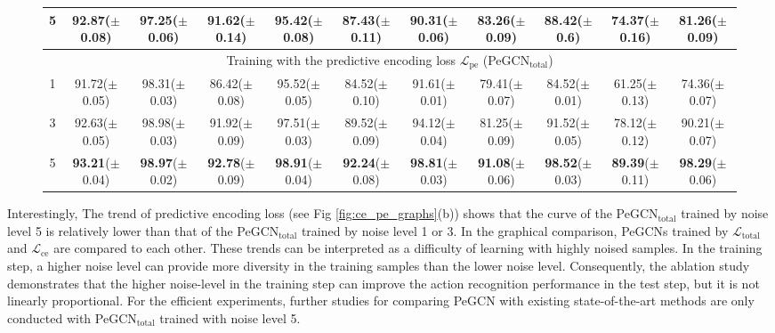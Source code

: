 \documentclass[runningheads]{llncs}
\begin{document}
\begin{figure*}[t]
\begin{minipage}{\linewidth}
{\begin{tabular}{c c c c c c c c cc c}
		  5 &  92.87($\pm$0.08)&	97.25($\pm$0.06)&	91.62($\pm$0.14)&	95.42($\pm$0.08)&	87.43($\pm$0.11)&	90.31($\pm$0.06)&	83.26($\pm$0.09)&	88.42($\pm$0.6) &	74.37($\pm$0.16)&	81.26($\pm$0.09)\\
		\midrule
		\multicolumn{11}{c}{Training with the predictive encoding loss $\mathcal{L}_{\text{pe}}$ (PeGCN$_{\text{total}}$)} \\ 
		\midrule
		  1 &  91.72($\pm$0.05)&	98.31($\pm$0.03)&	86.42($\pm$0.08)&	95.52($\pm$0.05)&	84.52($\pm$0.10)&	91.61($\pm$0.01)&	79.41($\pm$0.07)&	84.52($\pm$0.01) &	61.25($\pm$0.13)&	74.36($\pm$0.07)\\
		  3 &  92.63($\pm$0.05)&	98.98($\pm$0.03)&	91.92($\pm$0.09)&	97.51($\pm$0.03)&	89.52($\pm$0.09)&	94.12($\pm$0.04)&	81.25($\pm$0.09)&	91.52($\pm$0.05) &	78.12($\pm$0.12)&	90.21($\pm$0.07)\\
		  5 & \textbf{93.21}($\pm$0.04)& \textbf{98.97}($\pm$0.02)&	\textbf{92.78}($\pm$0.09)&	\textbf{98.91}($\pm$0.04)&	\textbf{92.24}($\pm$0.08)&	\textbf{98.81}($\pm$0.03)&	\textbf{91.08}($\pm$0.06)&	\textbf{98.52}($\pm$0.03) &	\textbf{89.39}($\pm$0.11)&	\textbf{98.29}($\pm$0.06)  \\
		\midrule
		\bottomrule
	\end{tabular}
	}
\end{minipage}
\label{tbl:abl} 
\vspace{-4ex}
\end{figure*}

Interestingly, The trend of predictive encoding loss (see Fig \ref{fig:ce_pe_graphs}(b)) shows that the curve of the PeGCN$_{\text{total}}$ trained by noise level 5 is relatively lower than that of the PeGCN$_{\text{total}}$ trained by noise level 1 or 3. In the graphical comparison, PeGCNs trained by $\mathcal{L}_{\text{total}}$ and  $\mathcal{L}_{\text{ce}}$ are compared to each other. These trends can be interpreted as a difficulty of learning with highly noised samples. In the training step, a higher noise level can provide more diversity in the training samples than the lower noise level. Consequently, the ablation study demonstrates that the higher noise-level in the training step can improve the action recognition performance in the test step, but it is not linearly proportional. For the efficient experiments, further studies for comparing PeGCN with existing state-of-the-art methods are only conducted with PeGCN$_{\text{total}}$ trained with noise level 5. 
\end{document}

